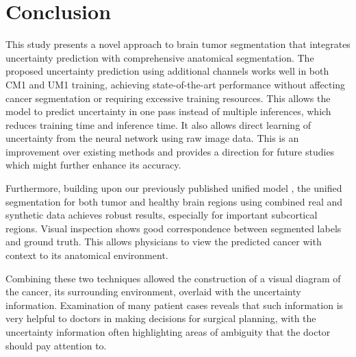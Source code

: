 \documentclass[11pt,letterpaper]{article}
\begin{document}
\section{Conclusion}
This study presents a novel approach to brain tumor segmentation that integrates uncertainty prediction with comprehensive anatomical segmentation. The proposed uncertainty prediction using additional channels works well in both CM1 and UM1 training, achieving state-of-the-art performance without affecting cancer segmentation or requiring excessive training resources. This allows the model to predict uncertainty in one pass instead of multiple inferences, which reduces training time and inference time. It also allows direct learning of uncertainty from the neural network using raw image data. This is an improvement over existing methods and provides a direction for future studies which might further enhance its accuracy.

Furthermore, building upon our previously published unified model \cite{zhou2025unified}, the unified segmentation for both tumor and healthy brain regions using combined real and synthetic data achieves robust results, especially for important subcortical regions. Visual inspection shows good correspondence between segmented labels and ground truth. This allows physicians to view the predicted cancer with context to its anatomical environment.

Combining these two techniques allowed the construction of a visual diagram of the cancer, its surrounding environment, overlaid with the uncertainty information. Examination of many patient cases reveals that such information is very helpful to doctors in making decisions for surgical planning, with the uncertainty information often highlighting areas of ambiguity that the doctor should pay attention to.



\newpage
\appendix
\end{document}
